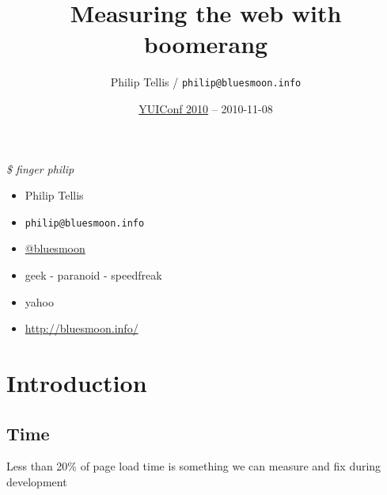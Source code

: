 \documentclass{beamer}
\author{Philip Tellis / \texttt{philip@bluesmoon.info}}
\title{Measuring the web with boomerang}
\date{\href{http://yuilibrary.com/yuiconf2010/}{YUIConf 2010} -- 2010-11-08}
\begin{document}
\begin{frame}
  \titlepage
\end{frame}


\begin{frame}{\textit{\$ finger philip}}
  \begin{itemize}
  \item Philip Tellis
  \item \small{\texttt{philip@bluesmoon.info}}
  \item \href{http://twitter.com/bluesmoon}{@bluesmoon}
  \item geek - paranoid - speedfreak
  \item yahoo
  \item \href{http://bluesmoon.info/}{http://bluesmoon.info/}
  \end{itemize}
\end{frame}


\section{Introduction}
\label{sec:intro}

\subsection{Time}

\begin{frame}{}
\end{frame}

\begin{frame}{}
\end{frame}

\begin{frame}{}
\end{frame}

\begin{frame}{}
  \begin{center}
  Less than 20\% of page load time is something we can measure and fix during development
  \end{center}
\end{frame}
\end{document}
